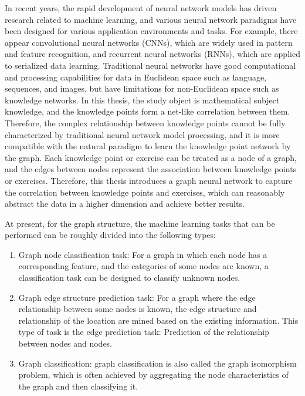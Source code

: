 
In recent years, the rapid development of neural network models has driven research related to machine learning, and various neural network paradigms have been designed for various application environments and tasks. For example, there appear convolutional neural networks (CNNs), which are widely used in pattern and feature recognition, and recurrent neural networks (RNNs), which are applied to serialized data learning. Traditional neural networks have good computational and processing capabilities for data in Euclidean space such as language, sequences, and images, but have limitations for non-Euclidean space such as knowledge networks. In this thesis, the study object is mathematical subject knowledge, and the knowledge points form a net-like correlation between them. Therefore, the complex relationship between knowledge points cannot be fully characterized by traditional neural network model processing, and it is more compatible with the natural paradigm to learn the knowledge point network by the graph. Each knowledge point or exercise can be treated as a node of a graph, and the edges between nodes represent the association between knowledge points or exercises. Therefore, this thesis introduces a graph neural network to capture the correlation between knowledge points and exercises, which can reasonably abstract the data in a higher dimension and achieve better results.

At present, for the graph structure, the machine learning tasks that can be performed can be roughly divided into the following types:
\begin{enumerate}
    \item Graph node classification task: For a graph in which each node has a corresponding feature, and the categories of some nodes are known, a classification task can be designed to classify unknown nodes.
    \item Graph edge structure prediction task: For a graph where the edge relationship between some nodes is known, the edge structure and relationship of the location are mined based on the existing information. This type of task is the edge prediction task: Prediction of the relationship between nodes and nodes.
    \item Graph classification: graph classification is also called the graph isomorphism problem, which is often achieved by aggregating the node characteristics of the graph and then classifying it.
\end{enumerate}

